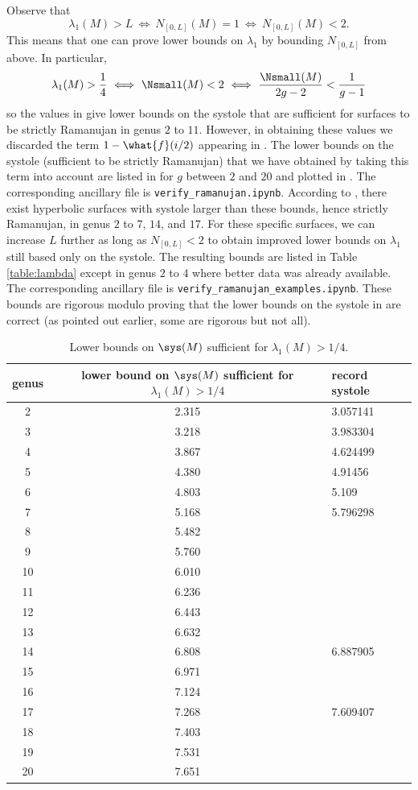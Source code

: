 \documentclass[12pt]{amsart}
\numberwithin{equation}{section}
\begin{document}
Observe that
\[
\lambda_1(M)>L \ \Longleftrightarrow \  N_{[0,L]}(M) = 1  \ \Longleftrightarrow \ N_{[0,L]}(M) < 2.
\]
This means that one can prove lower bounds on $\lambda_1$ by bounding $N_{[0,L]}$ from above. In particular,
\[
\lambda_1(M)>\frac14 \ \Longleftrightarrow \  \Nsmall(M) < 2  \ \Longleftrightarrow \ \frac{\Nsmall(M)}{2g-2} < \frac{1}{g-1}
\]
so the values in  give lower bounds on the systole that are sufficient for surfaces to be strictly Ramanujan in genus $2$ to $11$. However, in obtaining these values we discarded the term $1-\what{f}(i/2)$ appearing in . The lower bounds on the systole (sufficient to be strictly Ramanujan) that we have obtained by taking this term into account are listed in  for $g$ between $2$ and $20$ and plotted in . The corresponding ancillary file is \texttt{verify\_ramanujan.ipynb}. According to , there exist hyperbolic surfaces with systole larger than these bounds, hence strictly Ramanujan, in genus $2$ to $7$, $14$, and $17$. For these specific surfaces, we can increase $L$ further as long as $N_{[0,L]}<2$ to obtain improved lower bounds on $\lambda_1$ still based only on the systole. The resulting bounds are listed in Table \ref{table:lambda} except in genus $2$ to $4$ where better data was already available. The corresponding ancillary file is \texttt{verify\_ramanujan\_examples.ipynb}. These bounds are rigorous modulo proving that the lower bounds on the systole in  are correct (as pointed out earlier, some are rigorous but not all).

{\footnotesize
\begin{table}[htp] 
\centering
\caption{Lower bounds on $\sys(M)$ sufficient for $\lambda_1(M)>1/4$.} \label{table:gaps}
\begin{tabular}{|c|c|l|}
\hline
genus & lower bound on $\sys(M)$ sufficient for $\lambda_1(M)>1/4$  & record systole\\
\hline
2 & 2.315  & 3.057141 \\ 
3 & 3.218 & 3.983304 \\ 
4 & 3.867 & 4.624499\\ 
5 & 4.380 & 4.91456 \\ 
6 & 4.803 & 5.109\\
7 & 5.168 & 5.796298 \\
8 & 5.482 &\\
9 & 5.760 & \\
10 & 6.010 & \\
11 & 6.236 & \\
12 & 6.443 & \\
13 & 6.632 & \\
14 & 6.808 &6.887905  \\
15 & 6.971 & \\
16 & 7.124 &\\
17 & 7.268 & 7.609407 \\
18 & 7.403 & \\
19 & 7.531 & \\
20 & 7.651 & \\
\hline
\end{tabular}
\end{table}
}
\end{document}
